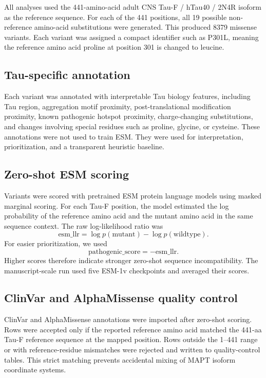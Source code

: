\documentclass[11pt]{article}
\begin{document}
All analyses used the 441-amino-acid adult CNS Tau-F / hTau40 / 2N4R isoform as
the reference sequence. For each of the 441 positions, all 19 possible
non-reference amino-acid substitutions were generated. This produced 8379
missense variants. Each variant was assigned a compact identifier such as P301L,
meaning the reference amino acid proline at position 301 is changed to leucine.

\subsection{Tau-specific annotation}

Each variant was annotated with interpretable Tau biology features, including Tau
region, aggregation motif proximity, post-translational modification proximity,
known pathogenic hotspot proximity, charge-changing substitutions, and changes
involving special residues such as proline, glycine, or cysteine. These
annotations were not used to train ESM. They were used for interpretation,
prioritization, and a transparent heuristic baseline.

\subsection{Zero-shot ESM scoring}

Variants were scored with pretrained ESM protein language models using masked
marginal scoring. For each Tau-F position, the model estimated the log
probability of the reference amino acid and the mutant amino acid in the same
sequence context. The raw log-likelihood ratio was
\[
  \mathrm{esm\_llr} = \log p(\mathrm{mutant}) - \log p(\mathrm{wildtype}).
\]
For easier prioritization, we used
\[
  \mathrm{pathogenic\_score} = -\mathrm{esm\_llr}.
\]
Higher scores therefore indicate stronger zero-shot sequence incompatibility. The
manuscript-scale run used five ESM-1v checkpoints and averaged their scores.

\subsection{ClinVar and AlphaMissense quality control}

ClinVar and AlphaMissense annotations were imported after zero-shot scoring. Rows
were accepted only if the reported reference amino acid matched the 441-aa Tau-F
reference sequence at the mapped position. Rows outside the 1--441 range or with
reference-residue mismatches were rejected and written to quality-control tables.
This strict matching prevents accidental mixing of MAPT isoform coordinate
systems.
\end{document}
